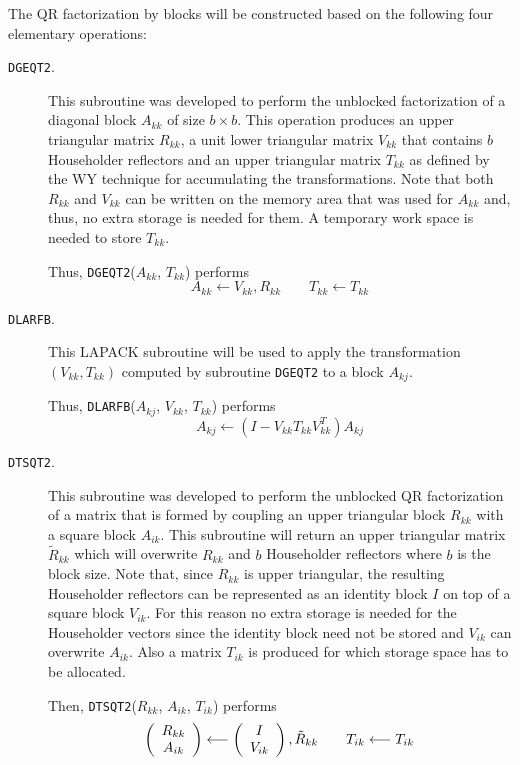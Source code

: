 \documentclass[runningheads]{llncs}
\begin{document}
The QR factorization by blocks will be constructed based on the
following four elementary operations:
\begin{description}
\item[\texttt{DGEQT2}.] This subroutine was developed to perform the
  unblocked factorization of a diagonal block $A_{kk}$ of size $b \times
  b$. This operation produces an upper triangular matrix $R_{kk}$, a
  unit lower triangular matrix $V_{kk}$ that contains $b$ Householder
  reflectors and an upper triangular matrix $T_{kk}$ as defined by the
  WY technique for accumulating the transformations. Note that both
  $R_{kk}$ and $V_{kk}$ can be written on the memory area that was used
  for $A_{kk}$ and, thus, no extra storage is needed for them. A
  temporary work space is needed to store $T_{kk}$.

  Thus, \texttt{DGEQT2}($A_{kk}$, $T_{kk}$) performs
  \begin{displaymath}
    A_{kk} \longleftarrow V_{kk}, R_{kk} \qquad T_{kk} \longleftarrow T_{kk}
  \end{displaymath}

\item[\texttt{DLARFB}.] This LAPACK subroutine will be used to apply
  the transformation $(V_{kk}, T_{kk})$ computed by subroutine
  \texttt{DGEQT2} to a block $A_{kj}$.

  Thus, \texttt{DLARFB}($A_{kj}$, $V_{kk}$, $T_{kk}$) performs
  \begin{displaymath}
    A_{kj} \longleftarrow (I-V_{kk}T_{kk}V^T_{kk})A_{kj}
  \end{displaymath}

\item[\texttt{DTSQT2}.] This subroutine was developed to perform the
  unblocked QR factorization of a matrix that is formed by coupling an
  upper triangular block $R_{kk}$ with a square block $A_{ik}$. This
  subroutine will return an upper triangular matrix $\tilde{R}_{kk}$
  which will overwrite $R_{kk}$ and $b$ Householder reflectors where $b$
  is the block size. Note
  that, since $R_{kk}$ is upper triangular, the resulting Householder
  reflectors can be represented as an identity block $I$ on top of a
  square block $V_{ik}$. For this reason no extra storage is needed for
  the Householder vectors  since the identity block need not be stored
  and $V_{ik}$ can overwrite $A_{ik}$. Also a matrix $T_{ik}$ is
  produced for which storage space has to be allocated.

  Then, \texttt{DTSQT2}($R_{kk}$, $A_{ik}$, $T_{ik}$) performs
  \begin{displaymath}
    \left(
      \begin{array}[!h]{c}
        R_{kk}\\
        A_{ik}
      \end{array}\right) \longleftarrow
    \left(\begin{array}[!h]{c}
        I\\
        V_{ik}
      \end{array}\right), \tilde{R}_{kk} \qquad T_{ik} \longleftarrow T_{ik}
  \end{displaymath}


\end{description}
\end{document}
